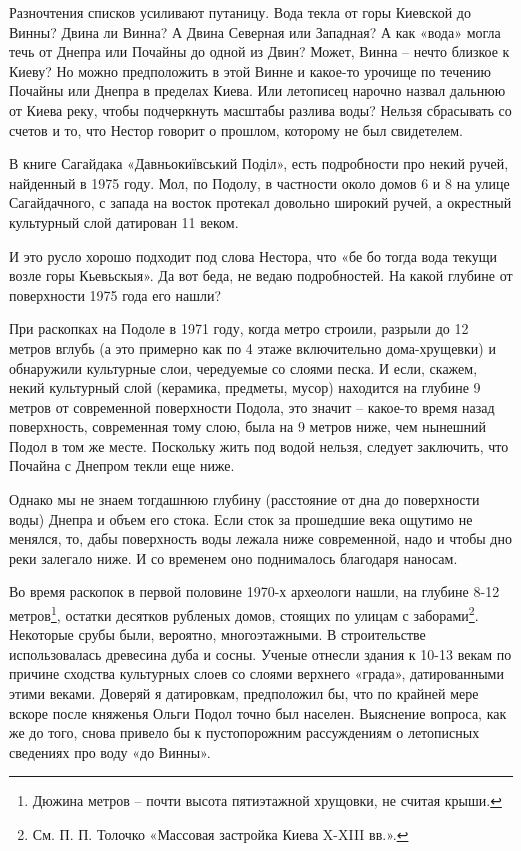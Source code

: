 Разночтения списков усиливают путаницу. Вода текла от горы Киевской до Винны? Двина ли Винна? А Двина Северная или Западная? А как «вода» могла течь от Днепра или Почайны до одной из Двин? Может, Винна – нечто близкое к Киеву? Но можно предположить в этой Винне и какое-то урочище по течению Почайны или Днепра в пределах Киева. Или летописец нарочно назвал дальнюю от Киева реку, чтобы подчеркнуть масштабы разлива воды? Нельзя сбрасывать со счетов и то, что Нестор говорит о прошлом, которому не был свидетелем.

В книге Сагайдака «Давньокиївський Поділ»,  есть подробности про некий ручей, найденный в 1975 году. Мол, по Подолу, в частности около домов 6 и 8 на улице Сагайдачного, с запада на восток протекал довольно широкий ручей, а окрестный культурный слой датирован 11 веком. 

И это русло хорошо подходит под слова Нестора, что «бе бо тогда вода текущи возле горы Кьевьскыя». Да вот беда, не ведаю подробностей. На какой глубине от поверхности 1975 года его нашли?

При раскопках на Подоле в 1971 году, когда метро строили, разрыли до 12 метров вглубь (а это примерно как по 4 этаже включительно дома-хрущевки) и обнаружили культурные слои, чередуемые со слоями песка. И если, скажем, некий культурный слой (керамика, предметы, мусор) находится на глубине 9 метров от современной поверхности Подола, это значит – какое-то время назад поверхность, современная тому слою, была на 9 метров ниже, чем нынешний Подол в том же месте. Поскольку жить под водой нельзя, следует заключить, что Почайна с Днепром текли еще ниже.

Однако мы не знаем тогдашнюю глубину (расстояние от дна до поверхности воды) Днепра и объем его стока. Если сток за прошедшие века ощутимо не менялся, то, дабы поверхность воды лежала ниже современной, надо и чтобы дно реки залегало ниже. И со временем оно поднималось благодаря наносам.

Во время раскопок в первой половине 1970-х археологи нашли, на глубине 8-12 метров\footnote{Дюжина метров – почти высота пятиэтажной хрущовки, не считая крыши.}, остатки десятков рубленых домов, стоящих по улицам с заборами\footnote{См. П. П. Толочко «Массовая застройка Киева X-XIII вв.».}. Некоторые срубы были, вероятно, многоэтажными. В строительстве использовалась древесина дуба и сосны. Ученые отнесли здания к 10-13 векам по причине сходства культурных слоев со слоями верхнего «града», датированными этими веками. Доверяй я датировкам, предположил бы, что по крайней мере вскоре после княженья Ольги Подол точно был населен. Выяснение вопроса, как же до того, снова привело бы к пустопорожним рассуждениям о летописных сведениях про воду «до Винны».

